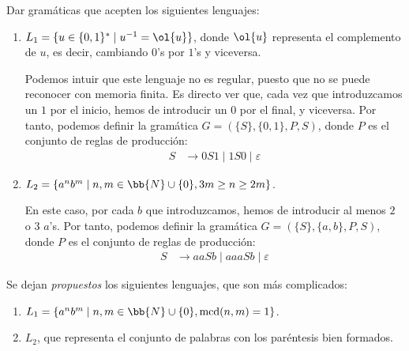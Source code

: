 \documentclass[12pt]{article}
\begin{document}
    \begin{ejercicio}
        Dar gramáticas que acepten los siguientes lenguajes:
        \begin{enumerate}
            \item $L_1 = \{u\in \{0,1\}^\ast \mid u^{-1}=\ol{u}\}$, donde $\ol{u}$ representa el complemento de $u$, es decir, cambiando $0$'s por $1$'s y viceversa.
            
            Podemos intuir que este lenguaje no es regular, puesto que no se puede reconocer con memoria finita.
            Es directo ver que, cada vez que introduzcamos un $1$ por el inicio, hemos de introducir un $0$ por el final, y viceversa. Por tanto, podemos definir la gramática $G=(\{S\},\{0,1\},P,S)$, donde $P$ es el conjunto de reglas de producción:
            \begin{align*}
                S &\rightarrow 0S1 \mid 1S0 \mid \varepsilon
            \end{align*}

            \item $L_2 = \{a^nb^m \mid n,m\in \bb{N}\cup\{0\}, 3m\geq n\geq 2m\}$.
            
            En este caso, por cada $b$ que introduzcamos, hemos de introducir al menos $2$ o $3$ $a$'s. Por tanto, podemos definir la gramática $G=(\{S\},\{a,b\},P,S)$, donde $P$ es el conjunto de reglas de producción:
            \begin{align*}
                S &\rightarrow aaSb \mid aaaSb \mid \varepsilon
            \end{align*}
        \end{enumerate}
    \end{ejercicio}

    \begin{ejercicio}
        Se dejan \emph{propuestos} los siguientes lenguajes, que son más complicados:
        \begin{enumerate}
            \item $L_1 = \{a^nb^m \mid n,m\in \bb{N}\cup\{0\}, \operatorname{mcd}(n,m)=1\}$.
            \item $L_2$, que representa el conjunto de palabras con los paréntesis bien formados.
        \end{enumerate}
        
    \end{ejercicio}
\end{document}
